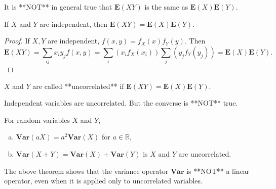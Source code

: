 \begin{caution}
It is **NOT** in general true that $\mathbf{E}(XY)$ is the same as $\mathbf{E}(X)\mathbf{E}(Y)$. 
\end{caution}

\begin{lemma}
If $X$ and $Y$ are independent, then $\mathbf{E}(XY) = \mathbf{E}(X)\mathbf{E}(Y)$. 
\end{lemma}
\begin{proof}
If $X, Y$ are independent, $f(x,y) = f_X(x) f_Y(y)$. Then
\begin{equation*}
    \mathbf{E}(XY) = \sum_{ij} x_i y_j f(x,y) = \sum_{i} \left( x_i f_X(x_i) \right) \sum_{j} \left( y_j f_Y(y_j) \right) = \mathbf{E}(X) \mathbf{E}(Y).
\end{equation*}
\end{proof}

\begin{definition}
$X$ and $Y$ are called **uncorrelated** if $\mathbf{E}(XY) = \mathbf{E}(X)\mathbf{E}(Y)$.
\end{definition}

\begin{caution}
Independent variables are uncorrelated. But the converse is **NOT** true.
\end{caution}

\begin{theorem}
For random variables $X$ and $Y$, 
\begin{enumerate}[(a)]
    \item $\mathbf{Var}(aX) = a^2 \mathbf{Var}(X)$ for $a \in \mathbb{R}$,
    \item $\mathbf{Var}(X+Y) = \mathbf{Var}(X) + \mathbf{Var}(Y)$ is $X$ and $Y$ are uncorrelated.
\end{enumerate}
\end{theorem}

\begin{remark}
The above theorem shows that the variance operator $\mathbf{Var}$ is **NOT** a linear operator, even when it 
is applied only to uncorrelated variables. 
\end{remark}

